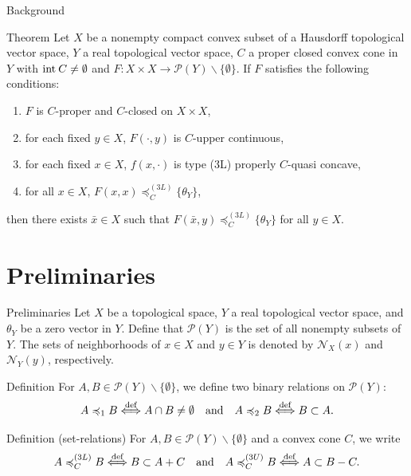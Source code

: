 \documentclass[aspectratio=169, dvipdfmx, 11pt]{beamer}
\newcommand{\Interior}[1]{\text{\rm int\:${#1}$}} %
\begin{document}
\begin{frame}{Background}
  \begin{block}{Theorem \cite{MR2778674}}
    Let $X$ be a nonempty compact convex subset of a Hausdorff topological vector space,
    $Y$ a real topological vector space, $C$ a proper closed convex cone in $Y$ with $\Interior{C} \ne \emptyset$
    and $F\colon X \times X \to \mathcal{P}(Y) \backslash \{\emptyset\}$. If $F$ satisfies the following conditions:
    \begin{enumerate}
      \item $F$ is $C$-proper and $C$-closed on $X \times X$,
      \item for each fixed $y \in X$, $F(\cdot,y)$ is $C$-upper continuous,
      \item for each fixed $x \in X$, $f(x, \cdot)$ is type (3L) properly $C$-quasi concave,
      \item for all $x \in X$, $F(x,x) \preccurlyeq_{C}^{(3L)} \{\theta_{Y}\}$,
    \end{enumerate}
    then there exists $\bar{x} \in X$ such that $F(\bar{x},y) \preccurlyeq_{C}^{(3L)} \{\theta_{Y}\}$ for all $y \in X$.
  \end{block}
\end{frame}

\section{Preliminaries}

\begin{frame}{Preliminaries}
  Let $X$ be a topological space, $Y$ a real topological vector space, and $\theta_Y$ be a zero vector in $Y$.
  Define that $\mathcal{P}(Y)$ is the set of all nonempty subsets of $Y$.
  The sets of neighborhoods of $x \in X$ and $y \in Y$ is denoted by $\mathcal{N}_X (x)$ and $\mathcal{N}_Y (y)$, respectively.

  \begin{block}{Definition}
    For $A,B \in \mathcal{P}(Y) \backslash \{\emptyset\}$, we define two binary relations on $\mathcal{P}(Y)$:
    \begin{equation}
      A \preccurlyeq_1 B \overset{\text{def}}{\Longleftrightarrow} A \cap B \ne \emptyset \quad \text{and} \quad A \preccurlyeq_2 B \overset{\text{def}}{\Longleftrightarrow} B \subset A. \notag
    \end{equation}
  \end{block}

  \begin{block}{Definition (set-relations) \cite{kuroiwa1997cone}}
    For $A,B \in \mathcal{P}(Y) \backslash \{\emptyset\}$ and a convex cone $C$, we write
    \begin{equation}
      A \preccurlyeq_{C}^{(3L)} B \overset{\text{def}}{\Longleftrightarrow} B \subset A + C
      \quad \text{and} \quad A \preccurlyeq_{C}^{(3U)} B \overset{\text{def}}{\Longleftrightarrow} A \subset B -C. \notag
    \end{equation}
  \end{block}
\end{frame}
\end{document}

